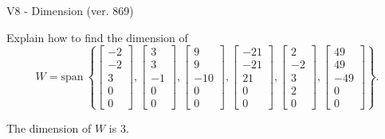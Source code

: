 \begin{exercise}
  \begin{exerciseTitle}V8 - Dimension (ver. 869)\end{exerciseTitle}
  \begin{exerciseStatement}
    Explain how to find the dimension of 
\[W=\mathrm{span}\ \left\{\left[\begin{array}{r}
-2 \\
-2 \\
3 \\
0 \\
0
\end{array}\right] , \left[\begin{array}{r}
3 \\
3 \\
-1 \\
0 \\
0
\end{array}\right] , \left[\begin{array}{r}
9 \\
9 \\
-10 \\
0 \\
0
\end{array}\right] , \left[\begin{array}{r}
-21 \\
-21 \\
21 \\
0 \\
0
\end{array}\right] , \left[\begin{array}{r}
2 \\
-2 \\
3 \\
2 \\
0
\end{array}\right] , \left[\begin{array}{r}
49 \\
49 \\
-49 \\
0 \\
0
\end{array}\right]\right\}.\]



  \end{exerciseStatement}
  \begin{exerciseAnswer}
   The dimension of \(W\) is  \(3\).
  


  \end{exerciseAnswer}
\end{exercise}